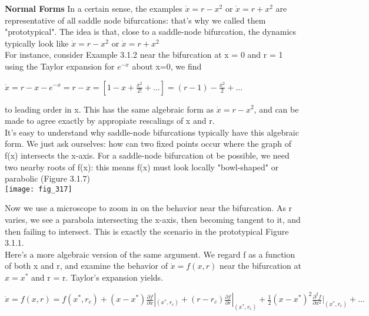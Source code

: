 \documentclass{article}
\newcommand\tab[1][1cm]{\hspace*{#1}}
\begin{document}
\textbf {Normal Forms}
In a certain sense, the examples $\dot{x} = r-x^{2}$ or $\dot{x} = r + x^{2}$ are representative of all saddle node bifurcations: that's why we called them "prototypical". The idea is that, close to a saddle-node bifurcation, the dynamics typically look like $\dot{x}=r-x^{2}$ or $\dot{x}=r+x^{2}$ \\
For instance, consider Example 3.1.2 near the bifurcation at x = 0 and r = 1 using the Taylor expansion for $e^{-x}$ about x=0, we find
\begin{center}
$\dot{x}=r-x-e^{-x} 
 = r-x= [1-x+\frac{x^{2}}{2!}+\hdots] = (r-1)-\frac{x^{2}}{2} + \hdots$
\end{center}
to leading order in x. This has the same algebraic form as $\dot{x}=r-x^{2}$, and can be made to agree exactly by appropiate rescalings of x and r. \\
\tab It's easy to understand why saddle-node bifurcations typically have this algebraic form. We just ask ourselves: how can two fixed points occur where the graph of f(x) intersects the x-axis. For a saddle-node bifurcation ot be possible, we need two nearby roots of f(x): this means f(x) must look locally "bowl-shaped" or parabolic (Figure 3.1.7) \\
\texttt{[image: fig\_317]}

Now we use a microscope to zoom in on the behavior near the bifurcation. As r varies, we see a parabola intersecting the x-axis, then becoming tangent to it, and then failing to intersect. This is exactly the scenario in the prototypical Figure 3.1.1. \\
Here's a more algebraic version of the same argument. We regard f as a function of both x and r, and examine the behavior of $\dot{x} = f(x,r)$ near the bifurcation at $x=x^{*}$ and r = r. Taylor's expansion yields.
\begin{center}
$\dot{x} = f(x,r) = f(x^{*}, r_{c}) + (x-x^{*})\frac{\partial{f}}{\partial{x}} |_{(x^{*},r_{c})} + (r-r_{c}){\frac{\partial{f}}{\partial{r}}}|_{(x^{*},r_{c})} + \frac{1}{2}(x-x^{*})^{2} \frac{\partial^{2}f}{\partial{x^{2}}}|_{(x^{*},r_{c})} + \hdots$
\end{center}
\end{document}
